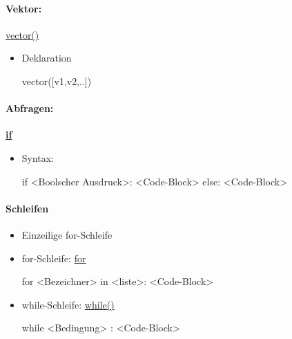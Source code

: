 \documentclass[a4paper,9pt,DIV15,twocolumn]{scrartcl}
\begin{document}
{\paragraph{Vektor:}\href{https://sage.math.uni-goettingen.de/doc/static/reference/sage/modules/free_module_element.html#sage.modules.free_module_element.vector}{vector()}
\begin{itemize}
 \item Deklaration
\begin{sageinsmall}
vector([v1,v2,..]) 
\end{sageinsmall}
\end{itemize}
\paragraph{Abfragen:} \href{http://docs.python.org/reference/compound_stmts.html#the-if-statement}{\textbf{if}}
\begin{itemize}
 \item  Syntax: \begin{sageinsmall}
if <Boolscher Ausdruck>:
    <Code-Block>
else:
    <Code-Block>
\end{sageinsmall}
\end{itemize}

\paragraph{Schleifen}
\begin{itemize}
\item Einzeilige for-Schleife
    \begin{sageinsmall}
    \end{sageinsmall}
\item for-Schleife: \href{http://docs.python.org/tutorial/controlflow.html#for-statements}{for}
    \begin{sageinsmall}
for <Bezeichner> in <liste>:
    <Code-Block>
    \end{sageinsmall}
  \item while-Schleife: \href{http://docs.python.org/reference/compound_stmts.html#the-while-statement}{while()}
\begin{sageinsmall}
while <Bedingung> :
    <Code-Block>
\end{sageinsmall}
\end{itemize}

}
\end{document}
